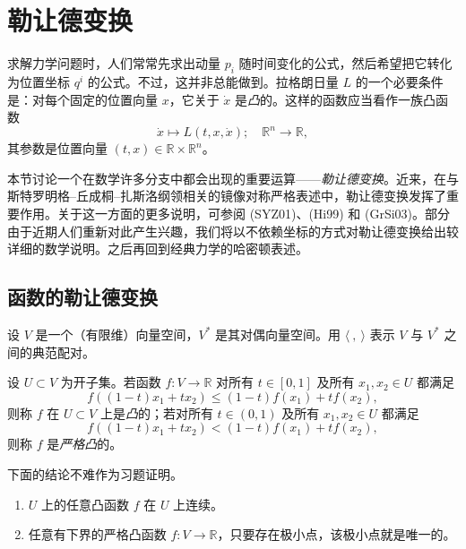 \section{勒让德变换}
\label{sec:legendre-transform}

求解力学问题时，人们常常先求出动量 $p_i$ 随时间变化的公式，然后希望把它转化为位置坐标 $q^i$ 的公式。不过，这并非总能做到。拉格朗日量 $L$ 的一个必要条件是：对每个固定的位置向量 $x$，它关于 $\dot x$ 是\emph{凸}的。这样的函数应当看作一族凸函数
\[
  \dot x\longmapsto L(t,x,\dot x);\quad\mathbb R^n\to\mathbb R,
\]
其参数是位置向量 $(t,x)\in\mathbb R\times\mathbb R^n$。

本节讨论一个在数学许多分支中都会出现的重要运算——\emph{勒让德变换}。近来，在与斯特罗明格--丘成桐--扎斯洛纲领相关的镜像对称严格表述中，勒让德变换发挥了重要作用。关于这一方面的更多说明，可参阅 (SYZ01)、(Hi99) 和 (GrSi03)。部分由于近期人们重新对此产生兴趣，我们将以不依赖坐标的方式对勒让德变换给出较详细的数学说明。之后再回到经典力学的哈密顿表述。

\subsection{函数的勒让德变换}
\label{sec:legendre-transform-function}

设 $V$ 是一个（有限维）向量空间，$V^*$ 是其对偶向量空间。用 $\langle\ ,\ \rangle$ 表示 $V$ 与 $V^*$ 之间的典范配对。

\begin{definition}
\label{def:convex-function}
设 $U\subset V$ 为开子集。若函数 $f:V\to\mathbb R$ 对所有 $t\in[0,1]$ 及所有 $x_1,x_2\in U$ 都满足
\begin{equation}\label{eq:convex-function}
  f((1-t)x_1+tx_2)\leq(1-t)f(x_1)+tf(x_2),
\end{equation}
则称 $f$ 在 $U\subset V$ 上是\emph{凸}的；若对所有 $t\in(0,1)$ 及所有 $x_1,x_2\in U$ 都满足
\begin{equation}\label{eq:strictly-convex-function}
  f((1-t)x_1+tx_2)<(1-t)f(x_1)+tf(x_2),
\end{equation}
则称 $f$ 是\emph{严格凸}的。
\end{definition}

下面的结论不难作为习题证明。

\begin{lemma}
\label{lem:convex-function-basics}
\begin{enumerate}[label=(\arabic*)]
  \item $U$ 上的任意凸函数 $f$ 在 $U$ 上连续。
  \item 任意有下界的严格凸函数 $f:V\to\mathbb R$，只要存在极小点，该极小点就是唯一的。
\end{enumerate}
\end{lemma}

